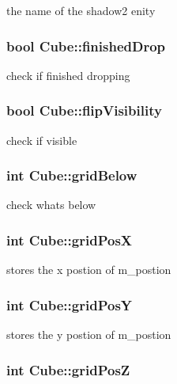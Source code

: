 the name of the shadow2 enity \hypertarget{class_cube_a0031d492bef46fc3b1c7f8349af10e93}{
\subsubsection[{finished\-Drop}]{\setlength{\rightskip}{0pt plus 5cm}bool Cube\-::finished\-Drop}}\label{class_cube_a0031d492bef46fc3b1c7f8349af10e93}
check if finished dropping \hypertarget{class_cube_a6d5327a45addd39b6190e3d400228842}{
\subsubsection[{flip\-Visibility}]{\setlength{\rightskip}{0pt plus 5cm}bool Cube\-::flip\-Visibility}}\label{class_cube_a6d5327a45addd39b6190e3d400228842}
check if visible \hypertarget{class_cube_af26a12fc948b957c304f584ad285b02a}{
\subsubsection[{grid\-Below}]{\setlength{\rightskip}{0pt plus 5cm}int Cube\-::grid\-Below}}\label{class_cube_af26a12fc948b957c304f584ad285b02a}
check whats below \hypertarget{class_cube_aface2c639c17ae3bb1180c165727b36c}{
\subsubsection[{grid\-Pos\-X}]{\setlength{\rightskip}{0pt plus 5cm}int Cube\-::grid\-Pos\-X}}\label{class_cube_aface2c639c17ae3bb1180c165727b36c}
stores the x postion of m\-\_\-postion \hypertarget{class_cube_a9b3f7676b19910f48842d6a7bee025b0}{
\subsubsection[{grid\-Pos\-Y}]{\setlength{\rightskip}{0pt plus 5cm}int Cube\-::grid\-Pos\-Y}}\label{class_cube_a9b3f7676b19910f48842d6a7bee025b0}
stores the y postion of m\-\_\-postion \hypertarget{class_cube_a40c395b356dbdd774dc24d870075fa7e}{
\subsubsection[{grid\-Pos\-Z}]{\setlength{\rightskip}{0pt plus 5cm}int Cube\-::grid\-Pos\-Z}}\label{class_cube_a40c395b356dbdd774dc24d870075fa7e}
